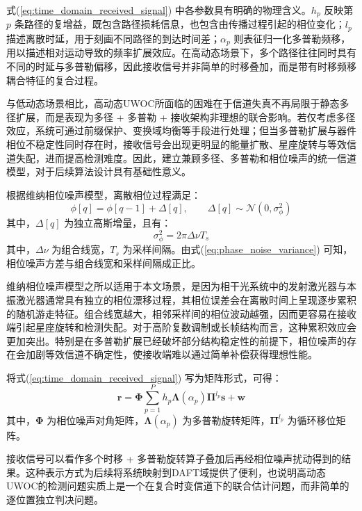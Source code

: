 式(\ref{eq:time_domain_received_signal}) 中各参数具有明确的物理含义。$h_p$ 反映第 $p$ 条路径的复增益，既包含路径损耗信息，也包含由传播过程引起的相位变化；$l_p$ 描述离散时延，用于刻画不同路径的到达时间差；$\alpha_p$ 则表征归一化多普勒频移，用以描述相对运动导致的频率扩展效应。在高动态场景下，多个路径往往同时具有不同的时延与多普勒偏移，因此接收信号并非简单的时移叠加，而是带有时移频移耦合特征的复合过程。

与低动态场景相比，高动态UWOC所面临的困难在于信道失真不再局限于静态多径扩展，而是表现为多径 + 多普勒 + 接收架构非理想的联合影响。若仅考虑多径效应，系统可通过前缀保护、变换域均衡等手段进行处理；但当多普勒扩展与器件相位不稳定性同时存在时，接收信号会出现更明显的能量扩散、星座旋转与等效信道失配，进而提高检测难度。因此，建立兼顾多径、多普勒和相位噪声的统一信道模型，对于后续算法设计具有基础性意义。

根据维纳相位噪声模型，离散相位过程满足：
\begin{equation}
    \phi[q] = \phi[q-1] + \Delta[q],
    \qquad
    \Delta[q] \sim \mathcal{N}(0,\sigma_{\phi}^{2})
    \label{eq:phase_noise_process}
\end{equation}
其中，$\Delta[q]$ 为独立高斯增量，且有：
\begin{equation}
    \sigma_{\phi}^{2} = 2\pi \Delta \nu T_s
    \label{eq:phase_noise_variance}
\end{equation}
其中，$\Delta\nu$ 为组合线宽，$T_s$ 为采样间隔。由式(\ref{eq:phase_noise_variance}) 可知，相位噪声方差与组合线宽和采样间隔成正比。

维纳相位噪声模型之所以适用于本文场景，是因为相干光系统中的发射激光器与本振激光器通常具有独立的相位漂移过程，其相位误差会在离散时间上呈现逐步累积的随机游走特征。组合线宽越大，相邻采样间的相位波动越强，因而更容易在接收端引起星座旋转和检测失配。对于高阶复数调制或长帧结构而言，这种累积效应会更加突出。特别是在多普勒扩展已经破坏部分结构稳定性的前提下，相位噪声的存在会加剧等效信道不确定性，使接收端难以通过简单补偿获得理想性能。

将式(\ref{eq:time_domain_received_signal}) 写为矩阵形式，可得：
\begin{equation}
    \mathbf{r} = \boldsymbol{\Phi} \sum_{p=1}^{P} h_p \boldsymbol{\Lambda}(\alpha_p) \boldsymbol{\Pi}^{l_p} \mathbf{s} + \mathbf{w}
    \label{eq:matrix_received_signal}
\end{equation}
其中，$\boldsymbol{\Phi}$ 为相位噪声对角矩阵，$\boldsymbol{\Lambda}(\alpha_p)$ 为多普勒旋转矩阵，$\boldsymbol{\Pi}^{l_p}$ 为循环移位矩阵。

接收信号可以看作多个时移 + 多普勒旋转算子叠加后再经相位噪声扰动得到的结果。这种表示方式为后续将系统映射到DAFT域提供了便利，也说明高动态UWOC的检测问题实质上是一个在复合时变信道下的联合估计问题，而非简单的逐位置独立判决问题。

